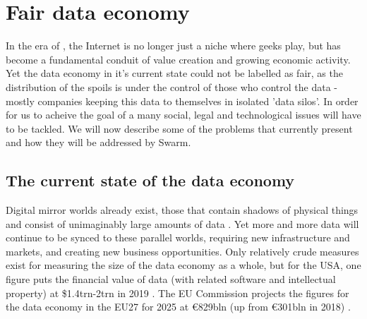 \section{Fair data economy  \statusgreen}\label{sec:fair-data}
\green{}

In the era of , the Internet is no longer just a niche where geeks play, but has become a fundamental conduit of value creation and growing economic activity. Yet the data economy in it's current state could not be labelled as fair, as the distribution of the spoils is under the control of those who control the data - mostly companies keeping this data to themselves in isolated 'data silos'. In order for us to acheive the goal of a  many social, legal and technological issues will have to be tackled. We will now describe some of the problems that currently present and how they will be addressed by Swarm. 

\subsection{The current state of the data economy  \statusgreen} \label{sec:dataeconomy}

Digital mirror worlds already exist, those that contain shadows of physical things and consist of unimaginably large amounts of data \cite{MirrorWorlds2020Feb}. Yet more and more data will continue to be synced to these parallel worlds, requiring new infrastructure and markets, and creating new business opportunities. Only relatively crude measures exist for measuring the size of the data economy as a whole, but for the USA, one figure puts the financial value of data (with related software and intellectual property) at \$1.4trn-2trn in 2019 \cite{MirrorWorlds2020Feb}. The EU Commission projects the figures for the data economy in the EU27 for 2025 at €829bln (up from €301bln in 2018) \cite{EUDataStrategy2020Feb}. 

